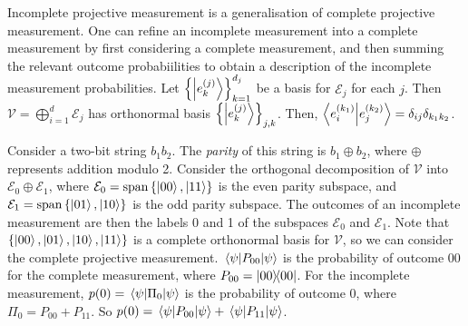 Incomplete projective measurement is a generalisation of complete projective measurement.
One can refine an incomplete measurement into a complete measurement by first considering a complete measurement, and then summing the relevant outcome probabiilities to obtain a description of the incomplete measurement probabilities.
Let \( \qty{\ket{e_k^{(j)}}}_{k=1}^{d_j} \) be a basis for \( \mathcal E_j \) for each \( j \).
Then \( \mathcal V = \bigoplus_{i=1}^d \mathcal E_j \) has orthonormal basis \( \qty{\ket{e_k^{(j)}}}_{j,k} \).
Then, \( \ip{e_i^{(k_1)}}{e_j^{(k_2)}} = \delta_{ij} \delta_{k_1 k_2} \).

Consider a two-bit string \( b_1 b_2 \).
The \emph{parity} of this string is \( b_1 \oplus b_2 \), where \( \oplus \) represents addition modulo 2.
Consider the orthogonal decomposition of \( \mathcal V \) into \( \mathcal E_0 \oplus \mathcal E_1 \), where \( \mathcal E_0 = \operatorname{span} \qty{\ket{00}, \ket{11}} \) is the even parity subspace, and \( \mathcal E_1 = \operatorname{span} \qty{\ket{01}, \ket{10}} \) is the odd parity subspace.
The outcomes of an incomplete measurement are then the labels 0 and 1 of the subspaces \( \mathcal E_0 \) and \( \mathcal E_1 \).
Note that \( \qty{\ket{00}, \ket{01}, \ket{10}, \ket{11}} \) is a complete orthonormal basis for \( \mathcal V \), so we can consider the complete projective measurement.
\( \ev{P_{00}}{\psi} \) is the probability of outcome \( 00 \) for the complete measurement, where \( P_{00} = \op{00}{00} \).
For the incomplete measurement, \( p(0) = \ev{\Pi_0}{\psi} \) is the probability of outcome 0, where \( \Pi_0 = P_{00} + P_{11} \).
So \( p(0) = \ev{P_{00}}{\psi} + \ev{P_{11}}{\psi} \).

